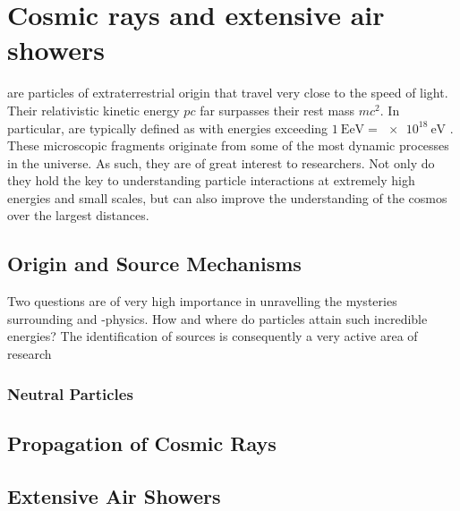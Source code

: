 
\chapter{Cosmic rays and extensive air showers}
\label{chap:cosmic-rays}

\CRs are particles of extraterrestrial origin that travel very close to the 
speed of light. Their relativistic kinetic energy $pc$ far surpasses their rest 
mass $mc^2$. In particular, \UHECRs are typically defined as \CRs with energies
exceeding $\SI{1}{\exa\eV} = \SI{e18}{\eV}$ \cite{AlvesBatista2019}. These
microscopic fragments originate from some of the most dynamic processes in the 
universe. As such, they are of great interest to researchers. Not only do they 
hold the key to understanding particle interactions at extremely high energies 
and small scales, but can also improve the understanding of the cosmos over the
largest distances.

\section{Origin and Source Mechanisms}
\label{sec:cr-accelerators}

Two questions are of very high importance in unravelling the mysteries 
surrounding \CRs and \UHE-physics. How and where do particles attain such 
incredible energies? The identification of \CR sources is consequently a very 
active area of research

\subsection{Neutral Particles}
\label{ssec:neutral-particles}



\section{Propagation of Cosmic Rays}
\label{sec:cr-propagation}



\section{Extensive Air Showers}
\label{sec:extensive-air-showers}



